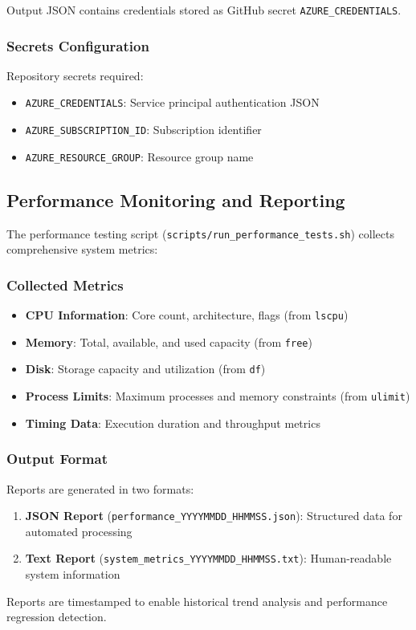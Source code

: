 \documentclass[11pt,a4paper]{article}
\begin{document}
Output JSON contains credentials stored as GitHub secret \texttt{AZURE\_CREDENTIALS}.

\subsubsection{Secrets Configuration}
Repository secrets required:
\begin{itemize}
    \item \texttt{AZURE\_CREDENTIALS}: Service principal authentication JSON
    \item \texttt{AZURE\_SUBSCRIPTION\_ID}: Subscription identifier
    \item \texttt{AZURE\_RESOURCE\_GROUP}: Resource group name
\end{itemize}

\subsection{Performance Monitoring and Reporting}

The performance testing script (\texttt{scripts/run\_performance\_tests.sh}) collects comprehensive system metrics:

\subsubsection{Collected Metrics}
\begin{itemize}
    \item \textbf{CPU Information}: Core count, architecture, flags (from \texttt{lscpu})
    \item \textbf{Memory}: Total, available, and used capacity (from \texttt{free})
    \item \textbf{Disk}: Storage capacity and utilization (from \texttt{df})
    \item \textbf{Process Limits}: Maximum processes and memory constraints (from \texttt{ulimit})
    \item \textbf{Timing Data}: Execution duration and throughput metrics
\end{itemize}

\subsubsection{Output Format}
Reports are generated in two formats:
\begin{enumerate}
    \item \textbf{JSON Report} (\texttt{performance\_YYYYMMDD\_HHMMSS.json}): Structured data for automated processing
    \item \textbf{Text Report} (\texttt{system\_metrics\_YYYYMMDD\_HHMMSS.txt}): Human-readable system information
\end{enumerate}

Reports are timestamped to enable historical trend analysis and performance regression detection.
\end{document}
